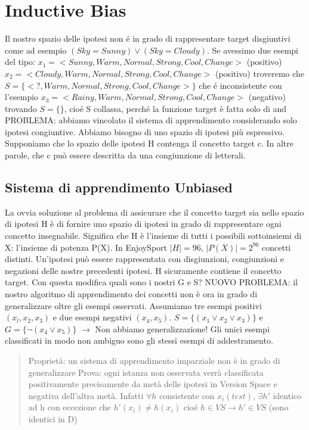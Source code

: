 \documentclass{article}
\begin{document}
\section{Inductive Bias}
Il nostro spazio delle ipotesi non é in grado di rappresentare target disgiuntivi come ad esempio $(Sky=Sunny) \lor (Sky=Cloudy)$. \newline
Se avessimo due esempi del tipo: \newline
$x_1 = <Sunny, Warm, Normal, Strong, Cool, Change>$ (positivo) \newline
$x_2 = <Cloudy, Warm, Normal, Strong, Cool, Change>$ (positivo) \newline
troveremo che $S = \{ <?, Warm, Normal, Strong, Cool, Change> \}$ \newline
che é inconsistente con l'esempio $x_3 = <Rainy, Warm, Normal, Strong, Cool, Change >$ (negativo) \newline
trovando $S = \{\}$, cioé S collassa, perché la funzione target è fatta solo di and \newline
PROBLEMA: abbiamo vincolato il sistema di apprendimento considerando solo ipotesi congiuntive. Abbiamo bisogno di uno spazio di ipotesi più espressivo. Supponiamo che lo spazio delle ipotesi H contenga il concetto target c. In altre parole, che c può essere descritta da una congiunzione di letterali.

\subsection{Sistema di apprendimento Unbiased}
La ovvia soluzione al problema di assicurare che il concetto target sia nello spazio di ipotesi H è di fornire uno spazio di ipotesi in grado di rappresentare ogni concetto insegnabile. \newline
Significa che H è l'insieme di tutti i possibili sottoinsiemi di X: l'insieme di potenza P(X). In EnjoySport $|H|=96$, $|P(X)|=2^96$ concetti distinti. Un'ipotesi può essere rappresentata con disgiunzioni, congiunzioni e negazioni delle nostre precedenti ipotesi. H sicuramente contiene il concetto target. Con questa modifica quali sono i nostri G e S? \newline
NUOVO PROBLEMA: il nostro algoritmo di apprendimento dei concetti non è ora in grado di generalizzare oltre gli esempi osservati. Assumiamo tre esempi positivi $(x_l, x_2, x_3)$ e due esempi negativi $(x_4, x_5)$. $S = \{(x_1 \lor x_2 \lor x_3) \}$ e $G = \{\neg (x_4 \lor x_5)\}$ $\rightarrow$ Non abbiamo generalizzazione! Gli unici esempi classificati in modo non ambiguo sono gli stessi esempi di addestramento.
\begin{quote}
    Proprietà: un sistema di apprendimento imparziale non è in grado di generalizzare \newline
    Prova: ogni istanza non osservata verrà classificata positivamente precisamente da metà delle ipotesi in Version Space e negativa dell'altra metà. Infatti $\forall h$ consistente con $x_i(test)$, $\exists h'$ identico ad h con eccezione che $h'(x_i) \neq h(x_i)$ cioé $h \in VS \rightarrow h' \in VS$ (sono identici in D)
\end{quote}
\end{document}

